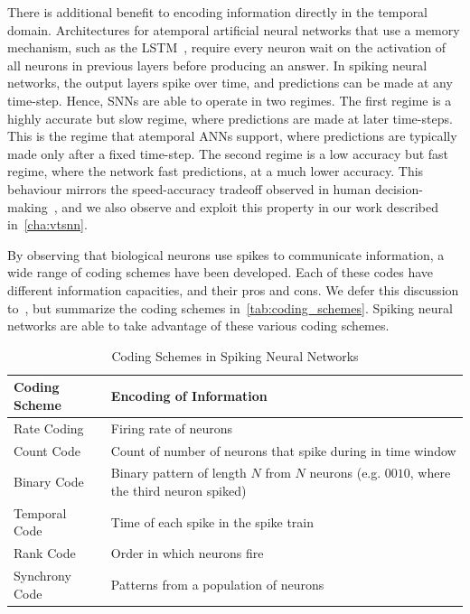 \documentclass[fyp]{socreport}
\begin{document}
There is additional benefit to encoding information directly in the temporal
domain. Architectures for atemporal artificial neural networks that use a memory
mechanism, such as the LSTM~\cite{hochreiter1997long}, require every neuron wait
on the activation of all neurons in previous layers before producing an answer.
In spiking neural networks, the output layers spike over time, and predictions
can be made at any time-step. Hence, SNNs are able to operate in two regimes.
The first regime is a highly accurate but slow regime, where predictions are
made at later time-steps. This is the regime that atemporal ANNs support, where
predictions are typically made only after a fixed time-step. The second regime
is a low accuracy but fast regime, where the network fast predictions, at a much
lower accuracy. This behaviour mirrors the speed-accuracy tradeoff observed in
human decision-making~\cite{comsa19_tempor_codin_spikin_neural_networ}, and we
also observe and exploit this property in our work described
in~\autoref{cha:vtsnn}.

By observing that biological neurons use spikes to communicate information, a
wide range of coding schemes have been developed. Each of these codes have
different information capacities, and their pros and cons. We defer this
discussion to~\cite{thorpe2001spike}, but summarize the coding schemes
in~\autoref{tab:coding_schemes}. Spiking neural networks are able to take
advantage of these various coding schemes.

\begin{table}
  \centering
  \small
  \begin{tabular}{|l|l|}
    \hline
    \hline
    \textbf{Coding Scheme} & \textbf{Encoding of Information} \\
    \hline
    Rate Coding & Firing rate of neurons \\
    Count Code & Count of number of neurons that spike during in time window \\
    Binary Code & Binary pattern of length $N$ from $N$ neurons (e.g. $0010$,
                  where the third neuron spiked) \\
    Temporal Code & Time of each spike in the spike
                    train \\
    Rank Code & Order in which neurons fire \\
    Synchrony Code & Patterns from a population of neurons \\
    \hline
    \hline
  \end{tabular}
  \normalsize
  \caption{Coding Schemes in Spiking Neural Networks}
  \label{tab:coding_schemes}
\end{table}
\end{document}
